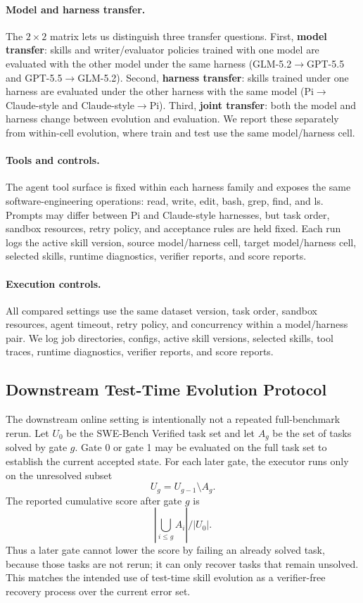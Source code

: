 \documentclass{article}
\begin{document}
\paragraph{Model and harness transfer.}
The $2{\times}2$ matrix lets us distinguish three transfer questions. First,
\textbf{model transfer}: skills and writer/evaluator policies trained with one
model are evaluated with the other model under the same harness
(GLM-5.2$\rightarrow$GPT-5.5 and GPT-5.5$\rightarrow$GLM-5.2). Second,
\textbf{harness transfer}: skills trained under one harness are evaluated under
the other harness with the same model (Pi$\rightarrow$Claude-style and
Claude-style$\rightarrow$Pi). Third, \textbf{joint transfer}: both the model and
harness change between evolution and evaluation. We report these separately
from within-cell evolution, where train and test use the same model/harness
cell.

\paragraph{Tools and controls.}
The agent tool surface is fixed within each harness family and exposes the same
software-engineering operations: read, write, edit, bash, grep, find, and ls.
Prompts may differ between Pi and Claude-style harnesses, but task order,
sandbox resources, retry policy, and acceptance rules are held fixed. Each run
logs the active skill version, source model/harness cell, target model/harness
cell, selected skills, runtime diagnostics, verifier reports, and score
reports.

\paragraph{Execution controls.}
All compared settings use the same dataset version, task order, sandbox
resources, agent timeout, retry policy, and concurrency within a model/harness
pair. We log job directories, configs, active skill versions, selected skills,
tool traces, runtime diagnostics, verifier reports, and score reports.

\subsection{Downstream Test-Time Evolution Protocol}

The downstream online setting is intentionally not a repeated full-benchmark
rerun. Let $U_0$ be the SWE-Bench Verified task set and let $A_g$ be the set of
tasks solved by gate $g$. Gate 0 or gate 1 may be evaluated on the full task
set to establish the current accepted state. For each later gate, the executor
runs only on the unresolved subset
\[
U_g = U_{g-1} \setminus A_g.
\]
The reported cumulative score after gate $g$ is
\[
\left|\bigcup_{i \le g} A_i\right| / |U_0|.
\]
Thus a later gate cannot lower the score by failing an already solved task,
because those tasks are not rerun; it can only recover tasks that remain
unsolved. This matches the intended use of test-time skill evolution as a
verifier-free recovery process over the current error set.
\end{document}
